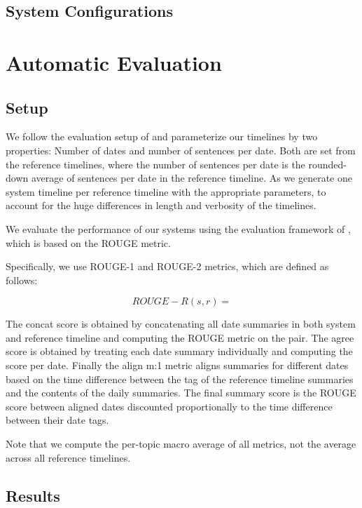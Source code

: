 \documentclass[a4paper,BCOR=10mm]{report}
\begin{document}
\section{System Configurations}



\chapter{Automatic Evaluation}

\section{Setup}

We follow the evaluation setup of \citet{markert} and parameterize our timelines by two properties: Number of dates and number of sentences per date. Both are set from the reference timelines, where the number of sentences per date is the rounded-down average of sentences per date in the reference timeline.
As \citeauthor{markert} we generate one system timeline per reference timeline with the appropriate parameters, to account for the huge differences in length and verbosity of the timelines.

We evaluate the performance of our systems using the evaluation framework of \citet{tilse}, which is based on the ROUGE \citep{rouge} metric.

Specifically, we use ROUGE-1 and ROUGE-2 metrics, which are defined as follows:

\begin{displaymath}
    ROUGE-R(s, r) = 
\end{displaymath}

The concat score is obtained by concatenating all date summaries in both system and reference timeline and computing the ROUGE metric on the pair.
The agree score is obtained by treating each date summary individually and computing the score per date.
Finally the align m:1 metric aligns summaries for different dates based on the time difference between the tag of the reference timeline summaries and the contents of the daily summaries. The final summary score is the ROUGE score between aligned dates discounted proportionally to the time difference between their date tags.

Note that we compute the per-topic macro average of all metrics, not the average across all reference timelines.

\section{Results}
\end{document}

